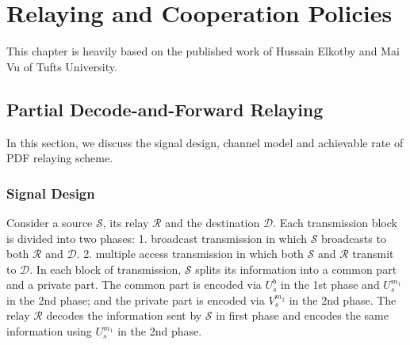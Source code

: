 \chapter{Relaying and Cooperation Policies}
This chapter is heavily based on the published work \cite{elk} of Hussain Elkotby and Mai Vu of Tufts University. 


\section{Partial Decode-and-Forward Relaying}
In this section, we discuss the signal design, channel model and achievable rate of PDF relaying scheme.
\subsection{Signal Design}
Consider a source $\mathcal{S}$, its relay $\mathcal{R}$ and the destination $\mathcal{D}$. Each transmission block is divided into two phases: 1. broadcast transmission in which $\mathcal{S}$ broadcasts to both $\mathcal{R}$ and $\mathcal{D}$. 2. multiple access transmission in which both $\mathcal{S}$ and $\mathcal{R}$ transmit to $\mathcal{D}$. In each block of transmission, $\mathcal{S}$ splits its information into a common part and a private part. The common part is encoded via $U_s^b$ in the 1st phase and $U_s^{m_1}$ in the 2nd phase; and the private part is encoded via $V_s^{m_2}$ in the 2nd phase. The relay $\mathcal{R}$ decodes the information sent by $\mathcal{S}$ in first phase and encodes the same information using $U_s^{m_1}$ in the 2nd phase. \\ 

